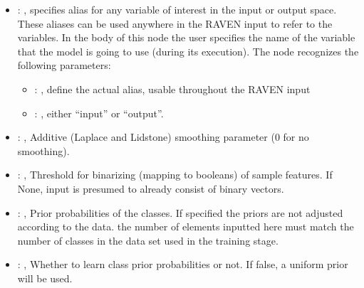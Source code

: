 \begin{itemize}
    \item {}: , 
      specifies alias for         any variable of interest in the input or output space. These
      aliases can be used anywhere in the RAVEN input to         refer to the variables. In the body
      of this node the user specifies the name of the variable that the model is going to use
      (during its execution).
      The  node recognizes the following parameters:
        \begin{itemize}
          \item {}: , 
            define the actual alias, usable throughout the RAVEN input
          \item {}: , 
            either ``input'' or ``output''.
      \end{itemize}

    \item {}: , 
      Additive (Laplace and Lidstone) smoothing parameter (0 for no smoothing).

    \item {}: , 
      Threshold for binarizing (mapping to booleans) of sample features. If None,
      input is presumed to already consist of binary vectors.

    \item {}: , 
      Prior probabilities of the classes. If specified the priors are
      not adjusted according to the data. \nb the number of elements inputted here must
      match the number of classes in the data set used in the training stage.

    \item {}: , 
      Whether to learn class prior probabilities or not. If false, a uniform
      prior will be used.
  \end{itemize}


